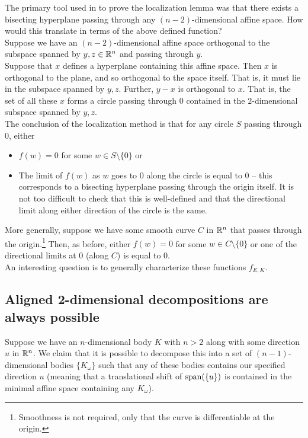 \documentclass{article}
\begin{document}
		The primary tool used in \cite{lov-sim-on7} to prove the localization lemma was that there exists a bisecting hyperplane passing through any $(n-2)$-dimensional affine space. How would this translate in terms of the above defined function?\\
		Suppose we have an $(n-2)$-dimensional affine space orthogonal to the subspace spanned by $y,z\in\mathbb{R}^n$ and passing through $y$.\\
		Suppose that $x$ defines a hyperplane containing this affine space. Then $x$ is orthogonal to the plane, and so orthogonal to the space itself. That is, it must lie in the subspace spanned by $y, z$. Further, $y-x$ is orthogonal to $x$. That is, the set of all these $x$ forms a circle passing through $0$ contained in the $2$-dimensional subspace spanned by $y,z$.\\
		The conclusion of the localization method is that for any circle $S$ passing through $0$, either
		\begin{itemize}
			\item $f(w) = 0$ for some $w \in S \setminus \{0\}$ or
			\item The limit of $f(w)$ as $w$ goes to $0$ along the circle is equal to $0$ -- this corresponds to a bisecting hyperplane passing through the origin itself. It is not too difficult to check that this is well-defined and that the directional limit along either direction of the circle is the same. 
		\end{itemize}

		More generally, suppose we have some smooth curve $C$ in $\mathbb{R}^n$ that passes through the origin.\footnote{Smoothness is not required, only that the curve is differentiable at the origin.} Then, as before, either $f(w) = 0$ for some $w \in C \setminus \{0\}$ or one of the directional limits at $0$ (along $C$) is equal to $0$.\\


		An interesting question is to generally characterize these functions $f_{E,K}$.

	\subsection{Aligned 2-dimensional decompositions are always possible}

		Suppose we have an $n$-dimensional body $K$ with $n>2$ along with some direction $u$ in $\mathbb{R}^n$. We claim that it is possible to decompose this into a set of $(n-1)$-dimensional bodies $\{K_\omega\}$ such that any of these bodies contains our specified direction $u$ (meaning that a translational shift of $\operatorname{span}(\{u\})$ is contained in the minimal affine space containing any $K_\omega$).\\
\end{document}
